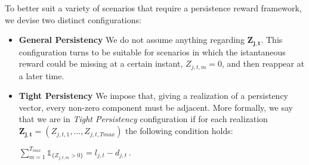 To better suit a variety of scenarios that require a persistence reward framework, we devise two distinct configurations:
\begin{itemize}
	\item \textbf{General Persistency} We do not assume anything regarding $\boldsymbol{Z_{j,t}}$. This configuration turns to be suitable for scenarios in which the istantaneous reward could be missing at a certain instant, $Z_{j,t,m} =0$, and then reappear at a later time. 
	
	\item \textbf{Tight Persistency} We impose that, giving a realization of a persistency vector, every non-zero component must be adjacent. More formally, we say that we are in \emph{Tight Persistency} configuration if for each realization $\boldsymbol{Z_{j,t}}= (Z_{j,t,1},\dots, Z_{j,t,Tmax})$ the following condition holds:
	
	\begin{center}
		
		$\sum_{m=1}^{T_{max}}\mathds{1}_{\{Z_{j,t,m}>0\}} = l_{j,t}-d_{j,t} \ .$

	
	\end{center}
\end{itemize}







